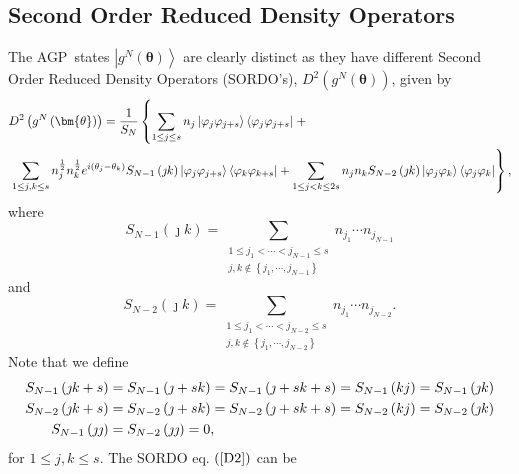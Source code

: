 \documentclass{preprint}
\begin{document}
\subsection{Second Order Reduced Density Operators\label{SORDO}}

The AGP\ states $\left\vert g^{N}\left( \bm{\theta}\right) \right\rangle $
are clearly distinct as they have different Second Order Reduced Density
Operators (SORDO's), $D^{2}\left( g^{N}\left( \bm{\theta}\right) \right) $,
given by \cite{Yukalov00}\cite{Coleman97}
\begin{align}
& D^{2}\left( g^{N}\left( \bm{\theta}\right) \right) =\frac{1}{S_{N}}\left\{
\sum_{1\leq j\leq s}n_{j}\left\vert \varphi_{j}\varphi _{j+s}\right\rangle
\left\langle \varphi_{j}\varphi_{j+s}\right\vert \right. +  \notag \\
& \left. \sum_{1\leq j,k\leq s}n_{j}^{\frac{1}{2}}n_{k}^{\frac{1}{2}%
}e^{i\left( \theta_{j}-\theta_{k}\right) }S_{N-1}\left( \jmath k\right)
\left\vert \varphi_{j}\varphi_{j+s}\right\rangle \left\langle \varphi
_{k}\varphi_{k+s}\right\vert +\sum_{1\leq j<k\leq2s}n_{j}n_{k}S_{N-2}\left(
\jmath k\right) \left\vert \varphi_{j}\varphi_{k}\right\rangle \left\langle
\varphi_{j}\varphi_{k}\right\vert \right\} ,  \label{D2}
\end{align}
where
\begin{equation}
S_{N-1}\left( \jmath k\right) =\sum_{\substack{ 1\leq j_{1}<\cdots
<j_{N-1}\leq s  \\ j,k\notin\left\{ j_{1},\cdots,j_{N-1}\right\} }}%
n_{j_{1}}\cdots n_{j_{N-1}}
\end{equation}
and
\begin{equation}
S_{N-2}\left( \jmath k\right) =\sum_{\substack{ 1\leq j_{1}<\cdots
<j_{N-2}\leq s  \\ j,k\notin\left\{ j_{1},\cdots,j_{N-2}\right\} }}%
n_{j_{1}}\cdots n_{j_{N-2}}.
\end{equation}
Note that we define
\begin{align}
S_{N-1}\left( \jmath k+s\right) & =S_{N-1}\left( \jmath+sk\right)
=S_{N-1}\left( \jmath+sk+s\right) =S_{N-1}\left( kj\right) =S_{N-1}\left(
\jmath k\right)  \notag \\
S_{N-2}\left( \jmath k+s\right) & =S_{N-2}\left( \jmath+sk\right)
=S_{N-2}\left( \jmath+sk+s\right) =S_{N-2}\left( kj\right) =S_{N-2}\left(
\jmath k\right)  \notag \\
S_{N-1}\left( \jmath\jmath\right) & =S_{N-2}\left( \jmath\jmath\right) =0,
\end{align}
for $1\leq j,k\leq s$. The SORDO eq. $\left( \ref{D2}\right) $ can be
\end{document}

